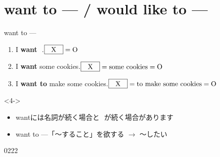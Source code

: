\documentclass[aspectratio=169,xcolor={dvipsnames,table}]{beamer}
\begin{document}
\section{want to --- / would like to ---}
\begin{frame}[plain]{want to ---}
 \begin{enumerate}
  \item[0.]<1-> I \textbf{want} \,\,.\hfill{\scriptsize $\fbox{\,\,\,\,X\,\,\,\,} = \text{O}$}
  \item<2-> I \textbf{want} some cookies.\hfill{\scriptsize $\fbox{\,\,\,\,X\,\,\,\,} = \text{some cookies} = \text{O}$}
  \item<3-> I \textbf{want to} make some cookies.\hfill{\scriptsize $\fbox{\,\,\,\,X\,\,\,\,} = \text{to make some cookies} = \text{O}$}
 \end{enumerate}

\vfill

\begin{block}<4->{}
\begin{itemize}[square]\small
 \item wantには名詞が続く場合と\,\,\,\,が続く場合があります
 \item want to ---「～すること」を欲する $\longrightarrow$ ～したい
\end{itemize}
\end{block}

\hfill{\tiny 0222}\,{\scriptsize {}}

\end{frame}
\end{document}
